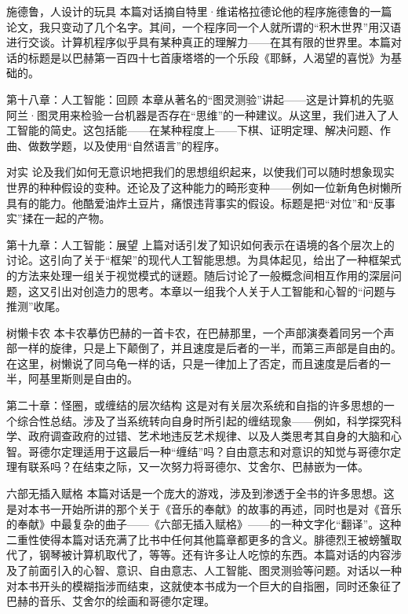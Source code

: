 \begin{overview}
\item[施德鲁，人设计的玩具]本篇对话摘自特里·维诺格拉德论他的程序施德鲁的一篇论文，我只变动了几个名字。其间，一个程序同一个人就所谓的“积木世界”用汉语进行交谈。计算机程序似乎具有某种真正的理解力——在其有限的世界里。本篇对话的标题是以巴赫第一百四十七首康塔塔的一个乐段《耶稣，人渴望的喜悦》为基础的。

\item[第十八章：人工智能：回顾]本章从著名的“图灵测验”讲起——这是计算机的先驱阿兰·图灵用来检验一台机器是否存在“思维”的一种建议。从这里，我们进入了人工智能的简史。这包括能——在某种程度上——下棋、证明定理、解决问题、作曲、做数学题，以及使用“自然语言”的程序。

\item[对实]论及我们如何无意识地把我们的思想组织起来，以使我们可以随时想象现实世界的种种假设的变种。还论及了这种能力的畸形变种——例如一位新角色树懒所具有的能力。他酷爱油炸土豆片，痛恨违背事实的假设。标题是把“对位”和“反事实”揉在一起的产物。

\item[第十九章：人工智能：展望]上篇对话引发了知识如何表示在语境的各个层次上的讨论。这引向了关于“框架”的现代人工智能思想。为具体起见，给出了一种框架式的方法来处理一组关于视觉模式的谜题。随后讨论了一般概念间相互作用的深层问题，这又引出对创造力的思考。本章以一组我个人关于人工智能和心智的“问题与推测”收尾。

\item[树懒卡农]本卡农摹仿巴赫的一首卡农，在巴赫那里，一个声部演奏着同另一个声部一样的旋律，只是上下颠倒了，并且速度是后者的一半，而第三声部是自由的。在这里，树懒说了同乌龟一样的话，只是一律加上了否定，而且速度是后者的一半，阿基里斯则是自由的。

\item[第二十章：怪圈，或缠结的层次结构]这是对有关层次系统和自指的许多思想的一个综合性总结。涉及了当系统转向自身时所引起的缠结现象——例如，科学探究科学、政府调查政府的过错、艺术地违反艺术规律、以及人类思考其自身的大脑和心智。哥德尔定理适用于这最后一种“缠结”吗？自由意志和对意识的知觉与哥德尔定理有联系吗？在结束之际，又一次努力将哥德尔、艾舍尔、巴赫嵌为一体。

\item[六部无插入赋格]本篇对话是一个庞大的游戏，涉及到渗透于全书的许多思想。这是对本书一开始所讲的那个关于《音乐的奉献》的故事的再述，同时也是对《音乐的奉献》中最复杂的曲子——《六部无插入赋格》——的一种文字化“翻译”。这种二重性使得本篇对话充满了比书中任何其他篇章都更多的含义。腓德烈王被螃蟹取代了，钢琴被计算机取代了，等等。还有许多让人吃惊的东西。本篇对话的内容涉及了前面引入的心智、意识、自由意志、人工智能、图灵测验等问题。对话以一种对本书开头的模糊指涉而结束，这就使本书成为一个巨大的自指圈，同时还象征了巴赫的音乐、艾舍尔的绘画和哥德尔定理。

\end{overview}
